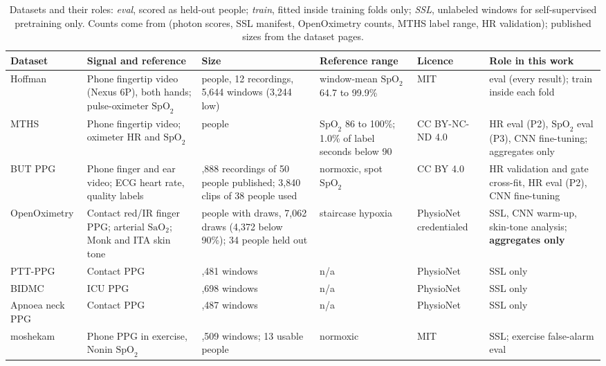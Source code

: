 \documentclass[11pt,letterpaper]{article}
\newcommand{\spo}{\ensuremath{\mathrm{SpO}_2}}
\newcommand{\sao}{\ensuremath{\mathrm{SaO}_2}}
\newcommand{\code}[1]{\texttt{\detokenize{#1}}}
\begin{document}
\begin{table}[tbp]
\centering
\caption{Datasets and their roles: \emph{eval}, scored as held-out people; \emph{train}, fitted inside training folds only; \emph{SSL}, unlabeled windows for self-supervised pretraining only. Counts come from \code{results/} (photon scores, SSL manifest, OpenOximetry counts, MTHS label range, HR validation); published sizes from the dataset pages.}\label{tab:data}
{\footnotesize\setlength{\tabcolsep}{3pt}
\begin{tabular}{@{}>{\raggedright\arraybackslash}p{2.0cm}>{\raggedright\arraybackslash}p{2.9cm}>{\raggedright\arraybackslash}p{3.1cm}>{\raggedright\arraybackslash}p{2.0cm}>{\raggedright\arraybackslash}p{1.75cm}>{\raggedright\arraybackslash}p{3.5cm}@{}}
\toprule
Dataset & Signal and reference & Size & Reference range & Licence & Role in this work \\
\midrule
Hoffman \cite{hoffman2022,hoffmandata} & Phone fingertip video (Nexus 6P), both hands; pulse-oximeter \spo{} & 6 people, 12 recordings, 5,644 windows (3,244 low) & window-mean \spo{} 64.7 to 99.9\% & MIT & eval (every result); train inside each fold \\
MTHS \cite{samavati2022} & Phone fingertip video; oximeter HR and \spo{} & 62 people & \spo{} 86 to 100\%; 1.0\% of label seconds below 90 & CC BY-NC-ND 4.0 & HR eval (P2), \spo{} eval (P3), CNN fine-tuning; aggregates only \\
BUT PPG \cite{nemcova2021,butppg2024} & Phone finger and ear video; ECG heart rate, quality labels & 3,888 recordings of 50 people published; 3,840 clips of 38 people used & normoxic, spot \spo{} & CC BY 4.0 & HR validation and gate cross-fit, HR eval (P2), CNN fine-tuning \\
OpenOximetry \cite{fong2025,openox2025} & Contact red/IR finger PPG; arterial \sao{}; Monk and ITA skin tone & 137 people with draws, 7,062 draws (4,372 below 90\%); 34 people held out & staircase hypoxia & PhysioNet credentialed & SSL, CNN warm-up, skin-tone analysis; \textbf{aggregates only} \\
PTT-PPG \cite{pttppg2022} & Contact PPG & 31,481 windows & n/a & PhysioNet & SSL only \\
BIDMC \cite{bidmcdata} & ICU PPG & 24,698 windows & n/a & PhysioNet & SSL only \\
Apnoea neck PPG & Contact PPG & 6,487 windows & n/a & PhysioNet & SSL only \\
moshekam & Phone PPG in exercise, Nonin \spo{} & 54,509 windows; 13 usable people & normoxic & MIT & SSL; exercise false-alarm eval \\
\bottomrule
\end{tabular}}
\end{table}
\end{document}
